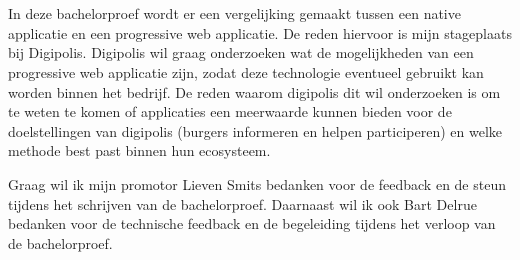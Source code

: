 
\chapter*{}
\label{ch:voorwoord}

In deze bachelorproef wordt er een vergelijking gemaakt tussen een native applicatie en een progressive web applicatie. De reden hiervoor is mijn stageplaats bij Digipolis. Digipolis wil graag onderzoeken wat de mogelijkheden van een progressive web applicatie zijn, zodat deze technologie eventueel gebruikt kan worden binnen het bedrijf. De reden waarom digipolis dit wil onderzoeken is om te weten te komen of applicaties een meerwaarde kunnen bieden voor de doelstellingen van digipolis (burgers informeren en helpen participeren) en welke methode best past binnen hun ecosysteem.

Graag wil ik mijn promotor Lieven Smits bedanken voor de feedback en de steun tijdens het schrijven van de bachelorproef. Daarnaast wil ik ook Bart Delrue bedanken voor de technische feedback en de begeleiding tijdens het verloop van de bachelorproef.





